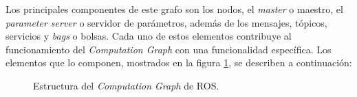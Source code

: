 Los principales componentes de este grafo son los nodos, el \textit{master} o maestro, el \textit{parameter server} o servidor de parámetros, además de los mensajes, tópicos, servicios y \textit{bags} o bolsas. Cada uno de estos elementos contribuye al funcionamiento del \textit{Computation Graph} con una funcionalidad específica. Los elementos que lo componen, mostrados en la figura \ref{fig:computationGraph}, se describen a continuación:

\newpage

\begin{figure}[ht]
    \centering
    \def\svgwidth{350pt}
    
    \caption{Estructura del \textit{Computation Graph} de ROS.}
    \label{fig:computationGraph}
\end{figure}

